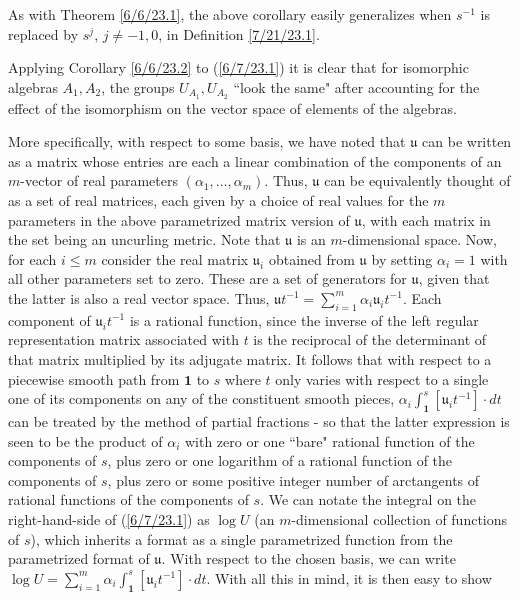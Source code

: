 \documentclass{amsart}
\numberwithin{equation}{section}
\theoremstyle{definition}
\numberwithin{theorem}{section}
\begin{document}
As with Theorem \ref{6/6/23.1}, the above corollary easily generalizes when $s^{-1}$ is replaced by $s^{j}$, $j\ne -1,0$, in Definition \ref{7/21/23.1}.

Applying Corollary \ref{6/6/23.2} to (\ref{6/7/23.1}) it is clear that for isomorphic algebras $A_1,A_2$, the groups $ U_{A_1},  U_{A_2}$ ``look the same" after accounting for the effect of the isomorphism on the vector space of elements of the algebras.

More specifically, with respect to some basis, we have noted that $\mathfrak{u}$ can be written as a matrix whose entries are each a linear combination of the components of an $m$-vector of real parameters $(\alpha_1, \dots, \alpha_m)$.   Thus, $\mathfrak{u}$ can be equivalently thought of as a set of real matrices, each given by a choice of real values for the $m$ parameters in the above parametrized matrix version of $\mathfrak{u}$, with each matrix in the set being an uncurling metric.   Note that $\mathfrak{u}$ is an $m$-dimensional space.    Now, for each $i\le m$ consider the real matrix  $\mathfrak{u}_i$ obtained from $\mathfrak{u}$ by setting $\alpha_i =1$ with all other parameters set to zero.  These are a set of generators for $\mathfrak{u}$, given that the latter is also a real vector space. Thus, $\mathfrak{u}t^{-1} = \sum_{i=1}^m \alpha_i \mathfrak{u}_i t^{-1}$.   Each component of $\mathfrak{u}_i t^{-1}$ is a rational function, since the inverse of the left regular representation matrix associated with $t$ is the reciprocal of the determinant of that matrix multiplied by its adjugate matrix.  It follows that  with respect to a piecewise smooth path from $\mathbf{1}$ to $s$ where $t$ only varies with respect to a single one of its components on any of the constituent smooth pieces, $\alpha_i \int_{\mathbf{1}}^s [\mathfrak{u}_i t^{-1}]\cdot dt$ can be treated by the method of partial fractions - so that the latter expression is seen to be the product of $\alpha_i$ with zero or one ``bare" rational function of the components of $s$, plus zero or one logarithm of a rational function of the components of $s$, plus zero or some positive integer number of arctangents of rational functions of the components of $s$.  We can notate the integral on the right-hand-side of (\ref{6/7/23.1}) as $\log  U$ (an $m$-dimensional collection of functions of $s$), which inherits a format as a single parametrized function from the parametrized format of $\mathfrak{u}$.  With respect to the chosen basis, we can write $\log  U =\sum_{i=1}^m \alpha_i \int_{\mathbf{1}}^s [\mathfrak{u}_i t^{-1}]\cdot dt$.  With all this in mind, it is then easy to show
\end{document}
